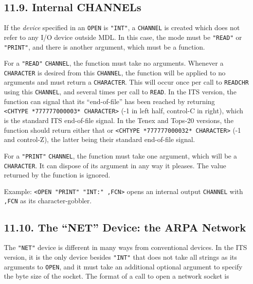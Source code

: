 \documentclass[a4paper,]{article}
\begin{document}
\subsection{11.9. Internal CHANNELs}\label{internal-channels}

If the \emph{device} specified in an \texttt{OPEN}  is \texttt{"INT"}, 
a \texttt{CHANNEL} is created which does not refer to any I/O device outside MDL. In this case, the mode must be
\texttt{"READ"} or \texttt{"PRINT"}, and there is another argument, which must be a function.

For a \texttt{"READ"} \texttt{CHANNEL}, the function must take no arguments. Whenever a \texttt{CHARACTER} is desired from
this \texttt{CHANNEL}, the function will be applied to no arguments and must return a \texttt{CHARACTER}. This will occur
once per call to \texttt{READCHR} using this \texttt{CHANNEL}, and several times per call to \texttt{READ}. In the ITS
 version, the function can signal that its ``end-of-file'' has been reached by returning
\texttt{\textless{}CHTYPE\ *777777000003*\ CHARACTER\textgreater{}} (-1 in left half, control-C in right), which is the
standard ITS end-of-file signal. In the Tenex  and Tops-20  versions, the
function should return either that or \texttt{\textless{}CHTYPE\ *777777000032*\ CHARACTER\textgreater{}} (-1 and
control-Z), the latter being their standard end-of-file signal.

For a \texttt{"PRINT"} \texttt{CHANNEL}, the function must take one argument, which will be a \texttt{CHARACTER}. It can
dispose of its argument in any way it pleases. The value returned by the function is ignored.

Example: \texttt{\textless{}OPEN\ "PRINT"\ "INT:"\ ,FCN\textgreater{}} opens an internal output \texttt{CHANNEL} with
\texttt{,FCN} as its character-gobbler.

\subsection{\texorpdfstring{11.10. The ``NET'' Device: the ARPA
Network}{11.10. The NET Device: the ARPA Network}}\label{the-net-device-the-arpa-network}

The \texttt{"NET"}  device is different in many ways from conventional devices. In the ITS
 version, it is the only device besides \texttt{"INT"} that does not take all strings as its arguments
to \texttt{OPEN}, and it must take an additional optional argument to specify the byte size of the
socket. The format of a call to open a network socket is
\end{document}
